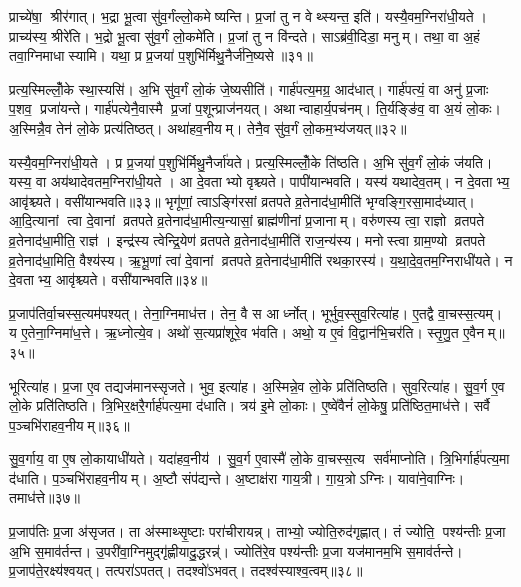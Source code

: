 प्राच्ये॑षा॒ श्रीर॑गात्। भ॒द्रा भू॒त्वा सु॑व॒र्गंल्लो॒कमेष्यन्ति। प्र॒जां तु न वेथ्स्यन्त॒ इति॑। यस्यै॒वम॒ग्निरा॑धी॒यते। प्राच्य॑स्य॒ श्रीरे॑ति। भ॒द्रो भू॒त्वा सु॑व॒र्गं लो॒कमे॑ति। प्र॒जां तु न वि॑न्दते। साऽब्र॑वी॒दिडा॒ मनुम्। तथा॒ वा अ॒हं तवा॒ग्निमाधास्यामि। यथा॒ प्र प्र॒जया॑ प॒शुभि॑र्मिथु॒नैर्ज॑नि॒ष्यसे॥३१॥

प्रत्य॒स्मिल्लोँ॒के स्था॒स्यसि॑। अ॒भि सु॑व॒र्गं लो॒कं जे॒ष्यसीति॑। गार्\mbox{}ह॑पत्य॒मग्र॒ आद॑धात्। गार्\mbox{}ह॑पत्यं॒ वा अनु॑ प्र॒जाः प॒शव॒ प्रजा॑यन्ते। गार्\mbox{}ह॑पत्येनै॒वास्मै प्र॒जां प॒शून्प्राज॑नयत्। अथान्वाहार्य॒पच॑नम्। ति॒र्यङ्ङि॑व॒ वा अ॒यं लो॒कः। अ॒स्मिन्नै॒व तेन॑ लो॒के प्रत्य॑तिष्ठत्। अथा॑हव॒नीयम्। तेनै॒व सु॑व॒र्गं लो॒कम॒भ्य॑जयत्॥३२॥

यस्यै॒वम॒ग्निरा॑धी॒यते। प्र प्र॒जया॑ प॒शुभि॑र्मिथु॒नैर्जा॑यते। प्रत्य॒स्मिल्लोँ॒के ति॑ष्ठति। अ॒भि सु॑व॒र्गं लो॒कं ज॑यति। यस्य॒ वा अय॑थादेवतम॒ग्निरा॑धी॒यते। आ दे॒वताभ्यो वृश्च्यते। पापी॑यान्भवति। यस्य॑ यथादेव॒तम्। न दे॒वताभ्य॒ आवृ॑श्च्यते। वसी॑यान्भवति॥३३॥ भृगू॑णां॒ त्वाऽङ्गि॑रसां व्रतपते व्र॒तेनाद॑धा॒मीति॑ भृग्वङ्गि॒रसा॒माद॑ध्यात्। आ॒दि॒त्यानां त्वा दे॒वानां व्रतपते व्र॒तेनाद॑धा॒मीत्य॒न्यासां॒ ब्राह्म॑णीनां प्र॒जानाम्। वरु॑णस्य त्वा॒ राज्ञो व्रतपते व्र॒तेनाद॑धा॒मीति॒ राज्ञ॑। इन्द्र॑स्य त्वेन्द्रि॒येण॑ व्रतपते व्र॒तेनाद॑धा॒मीति॑ राज॒न्य॑स्य। मनोस्त्वा ग्राम॒ण्यो व्रतपते व्र॒तेनाद॑धा॒मिति॒ वैश्य॑स्य। ऋ॒भू॒णां त्वा॑ दे॒वानां व्रतपते व्र॒तेनाद॑धा॒मीति॑ रथका॒रस्य॑। य॒था॒दे॒व॒तम॒ग्निराधी॑यते। न दे॒वताभ्य॒ आवृ॑श्च्यते। वसी॑यान्भवति॥३४॥

प्र॒जाप॑तिर्वा॒चस्स॒त्यम॑पश्यत्। तेना॒ग्निमाध॑त्त। तेन॒ वै स आर्ध्नोत्। भूर्भुव॒स्सुव॒रित्या॑ह। ए॒तद्वै वा॒चस्स॒त्यम्। य ए॒तेना॒ग्निमा॑ध॒त्ते। ऋ॒ध्नोत्ये॒व। अथो॑ स॒त्यप्रा॑शूरे॒व भ॑वति। अथो॒ य ए॒वं वि॒द्वान॑भि॒चर॑ति। स्तृ॒णु॒त ए॒वैनम्॥३५॥

भूरित्या॑ह। प्र॒जा ए॒व तद्यज॑मानस्सृजते। भुव॒ इत्या॑ह। अ॒स्मिन्ने॒व लो॒के प्रति॑तिष्ठति। सुव॒रित्या॑ह। सु॒व॒र्ग ए॒व लो॒के प्रति॑तिष्ठति। त्रि॒भिर॒क्षरै॒र्गार्\mbox{}ह॑पत्य॒मा द॑धाति। त्रय॑ इ॒मे लो॒काः। ए॒ष्वे॑वैनं॑ लो॒केषु॒ प्रति॑ष्ठित॒माध॑त्ते। सर्वै प॒ञ्चभि॑राहव॒नीयम्॥३६॥

सु॒व॒र्गाय॒ वा ए॒ष लो॒कायाधी॑यते। यदा॑हव॒नीय॑। सु॒व॒र्ग ए॒वास्मै॑ लो॒के वा॒चस्स॒त्य सर्व॑माप्नोति। त्रि॒भिर्गार्\mbox{}ह॑पत्य॒मा द॑धाति। प॒ञ्चभि॑राहव॒नीयम्। अ॒ष्टौ संप॑द्यन्ते। अ॒ष्टाक्ष॑रा गाय॒त्री। गा॒य॒त्रोऽग्निः। यावा॑ने॒वाग्निः। तमाध॑त्ते॥३७॥

प्र॒जाप॑तिः प्र॒जा अ॑सृजत। ता अ॑स्माथ्सृ॒ष्टाः परा॑चीरायन्न्। ताभ्यो॒ ज्योति॒रुद॑गृह्णात्। तं ज्योति॒ पश्य॑न्तीः प्र॒जा अ॒भि स॒माव॑र्तन्त। उ॒परी॑वा॒ग्निमुद्गृ॑ह्णीयादु॒द्धरन्न्॑। ज्योति॑रे॒व पश्य॑न्तीः प्र॒जा यज॑मानम॒भि स॒माव॑र्तन्ते। प्र॒जाप॑ते॒रक्ष्य॑श्वयत्। तत्परा॑ऽपतत्। तदश्वो॑ऽभवत्। तदश्व॑स्याश्व॒त्वम्॥३८॥

